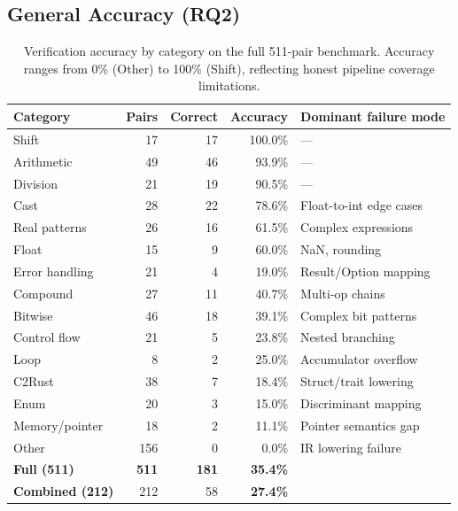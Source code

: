 \documentclass[10pt,a4paper]{article}
\begin{document}
\subsection{General Accuracy (RQ2)}\label{sec:eval-accuracy}

\begin{table}[t]
\centering
\small
\caption{Verification accuracy by category on the full 511-pair
benchmark.  Accuracy ranges from 0\% (Other) to 100\% (Shift),
reflecting honest pipeline coverage limitations.}
\label{tab:accuracy}
\begin{tabular}{@{}lrrrl@{}}
\toprule
Category & Pairs & Correct & Accuracy & Dominant failure mode \\
\midrule
Shift            & 17  & 17  & 100.0\% & --- \\
Arithmetic       & 49  & 46  & 93.9\% & --- \\
Division         & 21  & 19  & 90.5\% & --- \\
Cast             & 28  & 22  & 78.6\% & Float-to-int edge cases \\
Real patterns    & 26  & 16  & 61.5\% & Complex expressions \\
Float            & 15  & 9   & 60.0\% & NaN, rounding \\
Error handling   & 21  & 4   & 19.0\% & Result/Option mapping \\
Compound         & 27  & 11  & 40.7\% & Multi-op chains \\
Bitwise          & 46  & 18  & 39.1\% & Complex bit patterns \\
Control flow     & 21  & 5   & 23.8\% & Nested branching \\
Loop             & 8   & 2   & 25.0\% & Accumulator overflow \\
C2Rust           & 38  & 7   & 18.4\% & Struct/trait lowering \\
Enum             & 20  & 3   & 15.0\% & Discriminant mapping \\
Memory/pointer   & 18  & 2   & 11.1\% & Pointer semantics gap \\
Other            & 156 & 0   & 0.0\%  & IR lowering failure \\
\midrule
\textbf{Full (511)} & \textbf{511} & \textbf{181} &
  \textbf{35.4\%} & \\
\textbf{Combined (212)} & 212 & 58 & \textbf{27.4\%} & \\
\bottomrule
\end{tabular}
\end{table}
\end{document}
